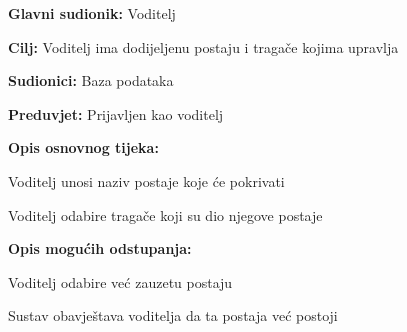 					\noindent {}
					\begin{packed_item}
						
						\item \textbf{Glavni sudionik: }Voditelj
						\item  \textbf{Cilj:} Voditelj ima dodijeljenu postaju i tragače kojima upravlja
						\item  \textbf{Sudionici:} Baza podataka
						\item  \textbf{Preduvjet:} Prijavljen kao voditelj
						\item  \textbf{Opis osnovnog tijeka:}
						
						\item[] \begin{packed_enum}
							
							\item Voditelj unosi naziv postaje koje će pokrivati
							\item Voditelj odabire tragače koji su dio njegove postaje
							
							\end{packed_enum}
						\item  \textbf{Opis mogućih odstupanja:}
						
						\item[] \begin{packed_item}
							
							\item[2.a] Voditelj odabire već zauzetu postaju
							\item[] \begin{packed_enum}
								
								\item Sustav obavještava voditelja da ta postaja već postoji
								
							\end{packed_enum}
							
						\end{packed_item}
						
						
					\end{packed_item}
					
